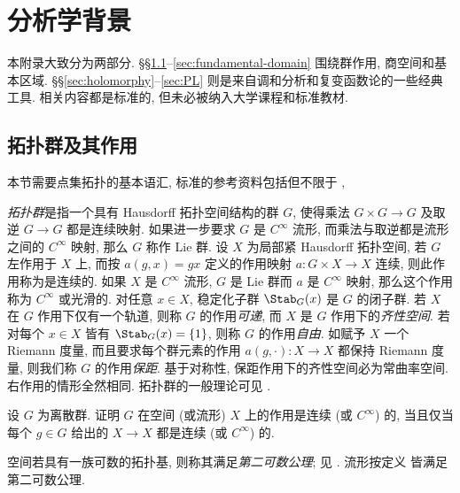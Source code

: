 
\chapter{分析学背景}
本附录大致分为两部分. \S\S\ref{sec:topological-group}--\ref{sec:fundamental-domain} 围绕群作用, 商空间和基本区域. \S\S\ref{sec:holomorphy}--\ref{sec:PL} 则是来自调和分析和复变函数论的一些经典工具. 相关内容都是标准的, 但未必被纳入大学课程和标准教材.

\section{拓扑群及其作用}\label{sec:topological-group}
本节需要点集拓扑的基本语汇, 标准的参考资料包括但不限于 \cite{Xiong, You},

\emph{拓扑群}是指一个具有 Hausdorff 拓扑空间结构的群 $G$, 使得乘法 $G \times G \to G$ 及取逆 $G \to G$ 都是连续映射. 如果进一步要求 $G$ 是 $C^\infty$ 流形, 而乘法与取逆都是流形之间的 $C^\infty$ 映射, 那么 $G$ 称作 Lie 群. 设 $X$ 为局部紧 Hausdorff 拓扑空间, 若 $G$ 左作用于 $X$ 上, 而按 $a(g,x) = gx$ 定义的作用映射 $a: G \times X \to X$ 连续, 则此作用称为是连续的. 如果 $X$ 是 $C^\infty$ 流形, $G$ 是 Lie 群而 $a$ 是 $C^\infty$ 映射, 那么这个作用称为 $C^\infty$ 或光滑的. 对任意 $x \in X$, 稳定化子群 $\Stab_G(x)$ 是 $G$ 的闭子群. 若 $X$ 在 $G$ 作用下仅有一个轨道, 则称 $G$ 的作用\emph{可递}, 而 $X$ 是 $G$ 作用下的\emph{齐性空间}. 若对每个 $x \in X$ 皆有 $\Stab_G(x)=\{1\}$, 则称 $G$ 的作用\emph{自由}. 如赋予 $X$ 一个 Riemann 度量, 而且要求每个群元素的作用 $a(g, \cdot): X \to X$ 都保持 Riemann 度量, 则我们称 $G$ 的作用\emph{保距}. 基于对称性, 保距作用下的齐性空间必为常曲率空间. 右作用的情形全然相同. 拓扑群的一般理论可见 \cite{FL14}.

\begin{exercise}
	设 $G$ 为离散群. 证明 $G$ 在空间 (或流形) $X$ 上的作用是连续 (或 $C^\infty$) 的, 当且仅当每个 $g \in G$ 给出的 $X \to X$ 都是连续 (或 $C^\infty$) 的.
\end{exercise}

空间若具有一族可数的拓扑基, 则称其满足\emph{第二可数公理}; 见 \cite[第一章, \S 3.3 和 第二章, \S 1.3]{You}. 流形按定义 \cite[Chapter 1]{Lee13}皆满足第二可数公理.

